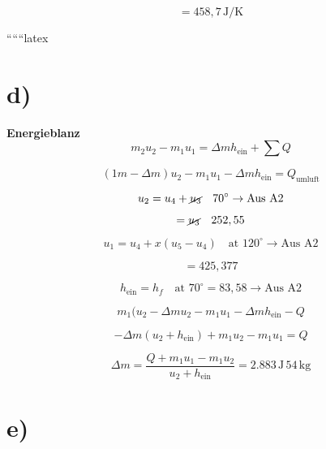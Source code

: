 \[
= 458,7 \, \text{J/K}
\]

``````latex


\section*{d)}

\textbf{Energieblanz}
\begin{equation*}
m_2 u_2 - m_1 u_1 = \Delta m h_{\text{ein}} + \sum Q
\end{equation*}

\begin{equation*}
(1m - \Delta m) u_2 - m_1 u_1 - \Delta m h_{\text{ein}} = Q_{\text{umluft}}
\end{equation*}

\begin{equation*}
u_2 = u_4 + \cancel{u_3} \quad 70^\circ \rightarrow \text{Aus A2}
\end{equation*}

\begin{equation*}
= \cancel{u_3} \quad 252,55
\end{equation*}

\begin{equation*}
u_1 = u_4 + x (u_5 - u_4) \quad \text{at } 120^\circ \rightarrow \text{Aus A2}
\end{equation*}

\begin{equation*}
= 425,377
\end{equation*}

\begin{equation*}
h_{\text{ein}} = h_f \quad \text{at } 70^\circ = 83,58 \rightarrow \text{Aus A2}
\end{equation*}

\begin{equation*}
m_1 (u_2 - \Delta m u_2 - m_1 u_1 - \Delta m h_{\text{ein}} - Q
\end{equation*}

\begin{equation*}
- \Delta m (u_2 + h_{\text{ein}}) + m_1 u_2 - m_1 u_1 = Q
\end{equation*}

\begin{equation*}
\Delta m = \frac{Q + m_1 u_1 - m_1 u_2}{u_2 + h_{\text{ein}}} = 2.883 \, \text{J} \, 54 \, \text{kg}
\end{equation*}

\section*{e)}

